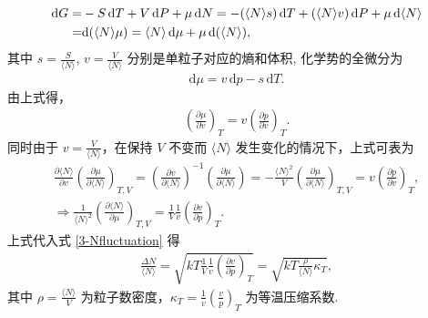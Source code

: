 \documentclass{assignment}
\begin{document}
\begin{pf}
\begin{align}
        \notag\mathrm{d}G=&-S\,\mathrm{d}T+V\,\mathrm{d}P+\mu\,\mathrm{d}N=-(\langle N\rangle s)\,\mathrm{d}T+(\langle N\rangle v)\,\mathrm{d}P+\mu\,\mathrm{d}\langle N\rangle\\
        =&\mathrm{d}(\langle N\rangle\mu)=\langle N\rangle\,\mathrm{d}\mu+\mu\,\mathrm{d}(\langle N\rangle),
    \end{align}
    其中 $s=\frac{S}{\langle N\rangle}$, $v=\frac{V}{\langle N\rangle}$ 分别是单粒子对应的熵和体积,
    化学势的全微分为
    \begin{align}
        \mathrm{d}\mu=v\,\mathrm{d}p-s\,\mathrm{d}T.
    \end{align}
    由上式得，
    \begin{align}
        \left(\frac{\partial\mu}{\partial v}\right)_T=v\left(\frac{\partial p}{\partial v}\right)_T.
    \end{align}
    同时由于 $v=\frac{V}{\langle N\rangle}$，在保持 $V$ 不变而 $\langle N\rangle$ 发生变化的情况下，上式可表为
    \begin{gather}
        \frac{\partial\langle N\rangle}{\partial v}\left(\frac{\partial\mu}{\partial\langle N\rangle}\right)_{T,V}=\left(\frac{\partial v}{\partial\langle N\rangle}\right)^{-1}\left(\frac{\partial\mu}{\partial\langle N\rangle}\right)=-\frac{\langle N\rangle^2}{V}\left(\frac{\partial\mu}{\partial\langle N\rangle}\right)_{T,V}=v\left(\frac{\partial p}{\partial v}\right)_T,\\
        \Longrightarrow\frac{1}{\langle N\rangle^2}\left(\frac{\partial\langle N\rangle}{\partial\mu}\right)_{T,V}=\frac{1}{V}\frac{1}{v}\left(\frac{\partial v}{\partial p}\right)_T.
    \end{gather}
    上式代入式 \eqref{3-Nfluctuation} 得
    \begin{align}
        \frac{\Delta N}{\langle N\rangle}=\sqrt{kT\frac{1}{V}\frac{1}{v}\left(\frac{\partial v}{\partial p}\right)_T}=\sqrt{kT\frac{\rho}{\langle N\rangle}\kappa_T},
    \end{align}
    其中 $\rho=\frac{\langle N\rangle}{V}$ 为粒子数密度，$\kappa_T=\frac{1}{v}\left(\frac{v}{p}\right)_T$ 为等温压缩系数.
\end{pf}
\end{document}
